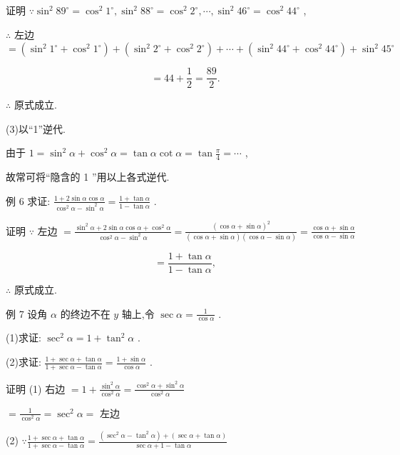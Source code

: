 \documentclass[10pt]{article}
\begin{document}
证明 \(\because {\sin }^{2}{89}^{ \circ  } = {\cos }^{2}{1}^{ \circ  },{\sin }^{2}{88}^{ \circ  } = {\cos }^{2}{2}^{ \circ  },\cdots ,{\sin }^{2}{46}^{ \circ  } = {\cos }^{2}{44}^{ \circ  }\) ,

\(\therefore\) 左边 \(= \left( {{\sin }^{2}{1}^{ \circ  } + {\cos }^{2}{1}^{ \circ  }}\right)  + \left( {{\sin }^{2}{2}^{ \circ  } + {\cos }^{2}{2}^{ \circ  }}\right)  + \cdots  + \left( {{\sin }^{2}{44}^{ \circ  } + {\cos }^{2}{44}^{ \circ  }}\right)  + {\sin }^{2}{45}^{ \circ  }\)

\[
= {44} + \frac{1}{2} = \frac{89}{2}.
\]

\(\therefore\) 原式成立.

(3)以“1”逆代.

由于 \(1 = {\sin }^{2}\alpha  + {\cos }^{2}\alpha  = \tan \alpha \cot \alpha  = \tan \frac{\pi }{4} = \cdots\) ,

故常可将“隐含的 1 ”用以上各式逆代.

例 6 求证: \(\frac{1 + 2\sin \alpha \cos \alpha }{{\cos }^{2}\alpha  - {\sin }^{2}\alpha } = \frac{1 + \tan \alpha }{1 - \tan \alpha }\) .

证明 \(\because\) 左边 \(= \frac{{\sin }^{2}\alpha  + 2\sin \alpha \cos \alpha  + {\cos }^{2}\alpha }{{\cos }^{2}\alpha  - {\sin }^{2}\alpha } = \frac{{\left( \cos \alpha  + \sin \alpha \right) }^{2}}{\left( {\cos \alpha  + \sin \alpha }\right) \left( {\cos \alpha  - \sin \alpha }\right) } = \frac{\cos \alpha  + \sin \alpha }{\cos \alpha  - \sin \alpha }\)

\[
= \frac{1 + \tan \alpha }{1 - \tan \alpha },
\]

\(\therefore\) 原式成立.

例 7 设角 \(\alpha\) 的终边不在 \(y\) 轴上,令 \(\sec \alpha  = \frac{1}{\cos \alpha }\) .

(1)求证: \({\sec }^{2}\alpha  = 1 + {\tan }^{2}\alpha\) .

(2)求证: \(\frac{1 + \sec \alpha  + \tan \alpha }{1 + \sec \alpha  - \tan \alpha } = \frac{1 + \sin \alpha }{\cos \alpha }\) .

证明 (1) 右边 \(= 1 + \frac{{\sin }^{2}\alpha }{{\cos }^{2}\alpha } = \frac{{\cos }^{2}\alpha  + {\sin }^{2}\alpha }{{\cos }^{2}\alpha }\)

\(= \frac{1}{{\cos }^{2}\alpha } = {\sec }^{2}\alpha  =\) 左边

(2) \(\because \frac{1 + \sec \alpha  + \tan \alpha }{1 + \sec \alpha  - \tan \alpha } = \frac{\left( {{\sec }^{2}\alpha  - {\tan }^{2}\alpha }\right)  + \left( {\sec \alpha  + \tan \alpha }\right) }{\sec \alpha  + 1 - \tan \alpha }\)
\end{document}
